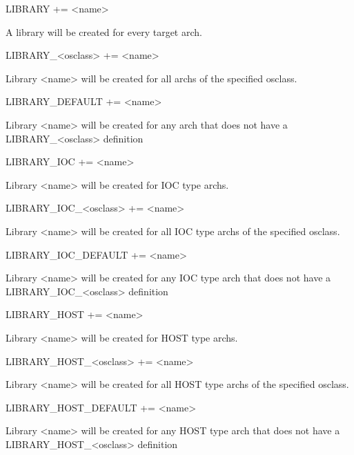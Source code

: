 \begin{description}

\item {}LIBRARY += \textless{}name\textgreater{}

A library will be created for every target arch.

\item LIBRARY\_\textless{}osclass\textgreater{} += \textless{}name\textgreater{}

Library \textless{}name\textgreater{} will be created for all archs of the specified osclass.

\item LIBRARY\_DEFAULT += \textless{}name\textgreater{}

Library \textless{}name\textgreater{} will be created for any arch that does not have a LIBRARY\_\textless{}osclass\textgreater{} definition

\item {}LIBRARY\_IOC += \textless{}name\textgreater{}

Library \textless{}name\textgreater{} will be created for IOC type archs.

\item LIBRARY\_IOC\_\textless{}osclass\textgreater{} += \textless{}name\textgreater{}

Library \textless{}name\textgreater{} will be created for all IOC type archs of the specified osclass.

\item LIBRARY\_IOC\_DEFAULT += \textless{}name\textgreater{}

Library \textless{}name\textgreater{} will be created for any IOC type arch that does not have a LIBRARY\_IOC\_\textless{}osclass\textgreater{} 
definition

\item {}LIBRARY\_HOST += \textless{}name\textgreater{}

Library \textless{}name\textgreater{} will be created for HOST type archs.

\item LIBRARY\_HOST\_\textless{}osclass\textgreater{} += \textless{}name\textgreater{}

Library \textless{}name\textgreater{} will be created for all HOST type archs of the specified osclass.

\item LIBRARY\_HOST\_DEFAULT += \textless{}name\textgreater{}

Library \textless{}name\textgreater{} will be created for any HOST type arch that does not have a LIBRARY\_HOST\_\textless{}osclass\textgreater{} 
definition

\end{description}

